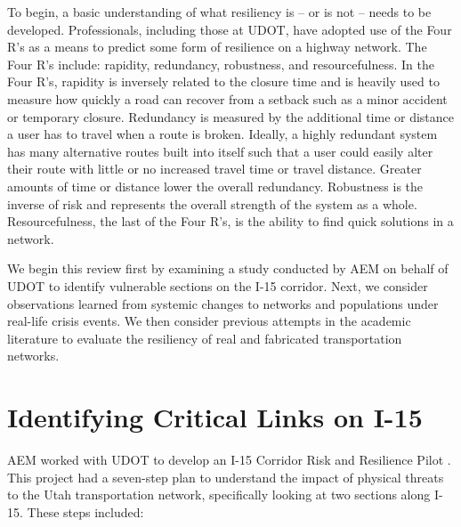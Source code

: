 To begin, a basic understanding of what resiliency is -- or is not -- needs
to be developed. Professionals, including those at UDOT, have adopted use of
the Four R’s as a means to predict some form of resilience on a highway
network. The Four R’s include: rapidity, redundancy, robustness, and
resourcefulness. In the Four R's, rapidity is inversely related to the closure
time and is heavily used to measure how quickly a road can recover from a
setback such as a minor accident or temporary closure. Redundancy is measured
by the additional time or distance a user has to travel when a route is broken.
Ideally, a highly redundant system has many alternative routes built into
itself such that a user could easily alter their route with little or no
increased travel time or travel distance. Greater amounts of time or distance
lower the overall redundancy. Robustness is the inverse of risk and represents
the overall strength of the system as a whole. Resourcefulness, the last of the
Four R’s, is the ability to find quick solutions in a network.

We begin this review first by examining a study conducted by AEM on
behalf of UDOT to identify
vulnerable sections on the I-15 corridor. Next, we consider observations
learned from systemic
changes to networks and populations under real-life crisis events. We then
consider previous
attempts in the academic literature to evaluate the resiliency of real and fabricated
transportation networks.

\section{Identifying Critical Links on I-15}

AEM worked with UDOT to develop an I-15 Corridor Risk and Resilience
Pilot \citep{aem2017}. This
project had a seven-step plan to understand the impact of physical threats
to the Utah
transportation network, specifically looking at two sections along I-15.
These steps included:

